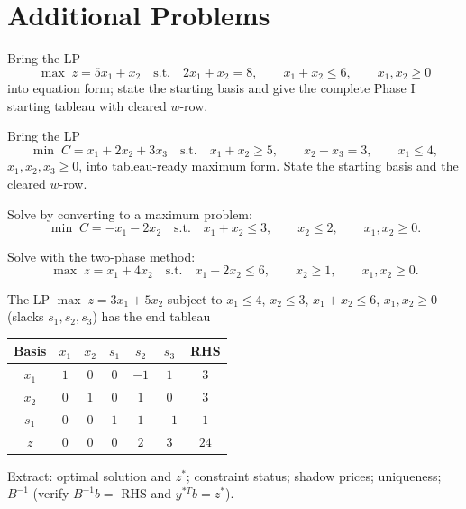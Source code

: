 \section{Additional Problems}

\begin{problems}
  \item Bring the LP
        \[
          \max\; z=5x_{1}+x_{2}
          \quad\text{s.t.}\quad
          2x_{1}+x_{2}=8,\qquad
          x_{1}+x_{2}\le 6,\qquad
          x_{1},x_{2}\ge 0
        \]
        into equation form; state the starting basis and give the complete
        Phase I starting tableau with cleared $w$-row.

  \item Bring the LP
        \[
          \min\; C=x_{1}+2x_{2}+3x_{3}
          \quad\text{s.t.}\quad
          x_{1}+x_{2}\ge 5,\qquad
          x_{2}+x_{3}=3,\qquad
          x_{1}\le 4,
        \]
        $x_{1},x_{2},x_{3}\ge 0$, into tableau-ready maximum form. State
        the starting basis and the cleared $w$-row.

  \item Solve by converting to a maximum problem:
        \[
          \min\; C=-x_{1}-2x_{2}
          \quad\text{s.t.}\quad
          x_{1}+x_{2}\le 3,\qquad
          x_{2}\le 2,\qquad
          x_{1},x_{2}\ge 0 .
        \]

  \item Solve with the two-phase method:
        \[
          \max\; z=x_{1}+4x_{2}
          \quad\text{s.t.}\quad
          x_{1}+2x_{2}\le 6,\qquad
          x_{2}\ge 1,\qquad
          x_{1},x_{2}\ge 0 .
        \]

  \item The LP $\max\; z=3x_{1}+5x_{2}$ subject to $x_{1}\le 4$,
        $x_{2}\le 3$, $x_{1}+x_{2}\le 6$, $x_{1},x_{2}\ge 0$ (slacks
        $s_{1},s_{2},s_{3}$) has the end tableau
        \begin{center}
        \begin{tabular}{c|ccccc|c}
        Basis & $x_{1}$ & $x_{2}$ & $s_{1}$ & $s_{2}$ & $s_{3}$ & RHS\\
        \hline
        $x_{1}$ & $1$ & $0$ & $0$ & $-1$ & $1$ & $3$\\
        $x_{2}$ & $0$ & $1$ & $0$ & $1$ & $0$ & $3$\\
        $s_{1}$ & $0$ & $0$ & $1$ & $1$ & $-1$ & $1$\\
        \hline
        $z$ & $0$ & $0$ & $0$ & $2$ & $3$ & $24$\\
        \end{tabular}
        \end{center}
        Extract: optimal solution and $z^{*}$; constraint status; shadow
        prices; uniqueness; $B^{-1}$ (verify $B^{-1}b=$ RHS and
        $y^{*T}b=z^{*}$).


\end{problems}
